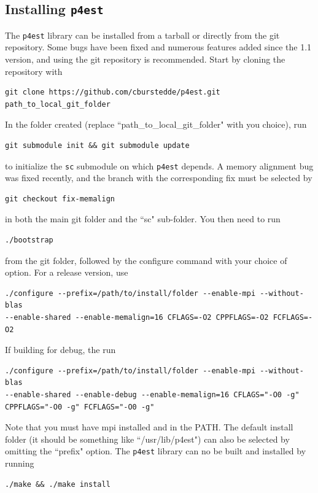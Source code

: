 \documentclass{article}
\begin{document}
\subsection{Installing \texttt{p4est}}

The \texttt{p4est} library can be installed from a tarball or directly from the git repository. Some bugs have been fixed and numerous features added since the 1.1 version, and using the git repository is recommended. Start by cloning the repository with
\begin{Verbatim}[frame=single]
git clone https://github.com/cburstedde/p4est.git path_to_local_git_folder
\end{Verbatim}
In the folder created (replace ``path\_to\_local\_git\_folder" with you choice), run
\begin{Verbatim}[frame=single]
git submodule init && git submodule update
\end{Verbatim}
to initialize the \texttt{sc} submodule on which \texttt{p4est} depends. A memory alignment bug was fixed recently, and the branch with the corresponding fix must be selected by
\begin{Verbatim}[frame=single]
git checkout fix-memalign
\end{Verbatim}
in both the main git folder and the ``sc" sub-folder. You then need to run
\begin{Verbatim}[frame=single]
./bootstrap
\end{Verbatim}
from the git folder, followed by the configure command with your choice of option. For a release version, use
\begin{Verbatim}[frame=single]
./configure --prefix=/path/to/install/folder --enable-mpi --without-blas
--enable-shared --enable-memalign=16 CFLAGS=-O2 CPPFLAGS=-O2 FCFLAGS=-O2
\end{Verbatim}
If building for debug, the run
\begin{Verbatim}[frame=single]
./configure --prefix=/path/to/install/folder --enable-mpi --without-blas
--enable-shared --enable-debug --enable-memalign=16 CFLAGS="-O0 -g"
CPPFLAGS="-O0 -g" FCFLAGS="-O0 -g"
\end{Verbatim}
Note that you must have mpi installed and in the PATH. The default install folder (it should be something like ``/usr/lib/p4est") can also be selected by omitting the ``prefix" option. The \texttt{p4est} library can no be built and installed by running
\begin{Verbatim}[frame=single]
./make && ./make install
\end{Verbatim}
\end{document}
